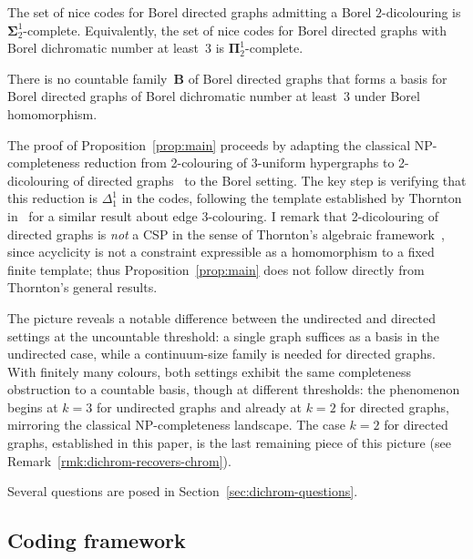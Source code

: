 \begin{proposition}\label{prop:main}
	The set of nice codes for Borel directed graphs admitting a Borel $2$-dicolouring is $\mathbf\Sigma^1_2$-complete.
	Equivalently, the set of nice codes for Borel directed graphs with Borel dichromatic number at least~$3$ is $\mathbf\Pi^1_2$-complete.
\end{proposition}

\begin{corollary}\label{cor:no-basis}
	There is no countable family~$\mathbf{B}$ of Borel directed graphs that forms a basis for Borel directed graphs of Borel dichromatic number at least~$3$ under Borel homomorphism.
\end{corollary}

The proof of Proposition~\ref{prop:main} proceeds by adapting the classical NP-completeness reduction from 2-colouring of 3-uniform hypergraphs to 2-dicolouring of directed graphs~\cite{Bokal_2004_CircularChrom} to the Borel setting.
The key step is verifying that this reduction is $\Delta^1_1$ in the codes, following the template established by Thornton in~\cite[Appendix~A]{thornton-thesis} for a similar result about edge 3-colouring.
I remark that 2-dicolouring of directed graphs is \emph{not} a CSP in the sense of Thornton's algebraic framework~\cite{thornton2022algebraic}, since acyclicity is not a constraint expressible as a homomorphism to a fixed finite template; thus Proposition~\ref{prop:main} does not follow directly from Thornton's general results.

The picture reveals a notable difference between the undirected and directed settings at the uncountable threshold: a single graph suffices as a basis in the undirected case, while a continuum-size family is needed for directed graphs.
With finitely many colours, both settings exhibit the same completeness obstruction to a countable basis, though at different thresholds: the phenomenon begins at $k=3$ for undirected graphs and already at $k=2$ for directed graphs, mirroring the classical NP-completeness landscape.
The case $k=2$ for directed graphs, established in this paper, is the last remaining piece of this picture (see Remark~\ref{rmk:dichrom-recovers-chrom}).

Several questions are posed in Section~\ref{sec:dichrom-questions}.

\subsection{Coding framework}\label{sec:framework}

